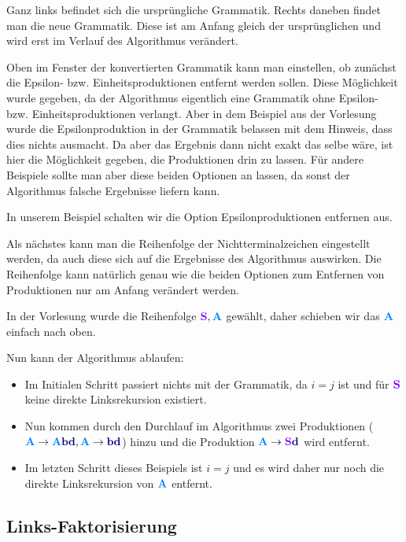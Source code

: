 Ganz links befindet sich die ursprüngliche Grammatik. Rechts daneben findet man die neue Grammatik. Diese ist am Anfang gleich der ursprünglichen und wird erst im Verlauf des Algorithmus verändert.

Oben im Fenster der konvertierten Grammatik kann man einstellen, ob zunächst die Epsilon- bzw. Einheitsproduktionen entfernt werden sollen. Diese Möglichkeit wurde gegeben, da der Algorithmus eigentlich eine Grammatik ohne Epsilon- bzw. Einheitsproduktionen verlangt. Aber in dem Beispiel aus der Vorlesung wurde die Epsilonproduktion in der Grammatik belassen mit dem Hinweis, dass dies nichts ausmacht. Da aber das Ergebnis dann nicht exakt das selbe wäre, ist hier die Möglichkeit gegeben, die Produktionen drin zu lassen. Für andere Beispiele sollte man aber diese beiden Optionen an lassen, da sonst der Algorithmus falsche Ergebnisse liefern kann.

In unserem Beispiel schalten wir die Option Epsilonproduktionen entfernen aus.

Als nächstes kann man die Reihenfolge der Nichtterminalzeichen eingestellt werden, da auch diese sich auf die Ergebnisse des Algorithmus auswirken. Die Reihenfolge kann natürlich genau wie die beiden Optionen zum Entfernen von Produktionen nur am Anfang verändert werden.

In der Vorlesung wurde die Reihenfolge $\StartSymbol{S}, \NonterminalSymbol{A}$ gewählt, daher schieben wir das $\NonterminalSymbol{A}$ einfach nach oben.

Nun kann der Algorithmus ablaufen:
\begin{itemize}
  \item Im Initialen Schritt passiert nichts mit der Grammatik, da $i = j$ ist und für $\StartSymbol{S}$ keine direkte Linksrekursion existiert.
  \item Nun kommen durch den Durchlauf im Algorithmus zwei Produktionen ($\NonterminalSymbol{A} \to \NonterminalSymbol{A}\TerminalSymbol{b}\TerminalSymbol{d},\NonterminalSymbol{A} \to \TerminalSymbol{b}\TerminalSymbol{d}$) hinzu und die Produktion $\NonterminalSymbol{A} \to \StartSymbol{S}\TerminalSymbol{d}$ wird entfernt.
  \item Im letzten Schritt dieses Beispiels ist $i = j$ und es wird daher nur noch die direkte Linksrekursion von $\NonterminalSymbol{A}$ entfernt.
\end{itemize}

\subsection{Links-Faktorisierung}

